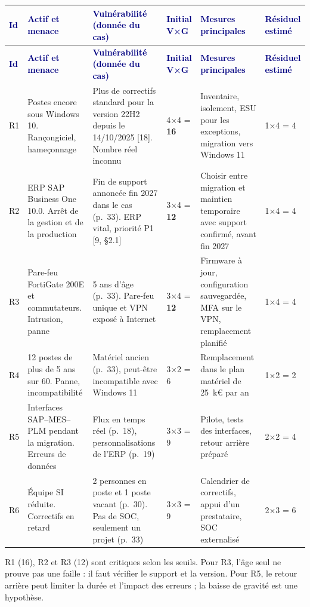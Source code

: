 \documentclass[11pt,a4paper]{article}
\newcommand{\thd}[1]{\textbf{\textcolor{navy}{#1}}}
\newcommand{\figsource}[1]{\par\vspace{-2pt}{\RaggedRight\footnotesize\textcolor{graytext}{#1}\par}}
\begin{document}
\begin{xltabular}{\linewidth}{@{}C{7mm}P{28mm}YC{15mm}YC{16mm}@{}}\toprule
\thd{Id} & \thd{Actif et menace} & \thd{Vulnérabilité (donnée du cas)} & \thd{Initial V×G} & \thd{Mesures principales} & \thd{Résiduel estimé}\\\midrule\endfirsthead
\toprule \thd{Id} & \thd{Actif et menace} & \thd{Vulnérabilité (donnée du cas)} & \thd{Initial V×G} & \thd{Mesures principales} & \thd{Résiduel estimé}\\\midrule\endhead
\bottomrule\endfoot
R1 & Postes encore sous Windows 10. Rançongiciel, hameçonnage & Plus de correctifs standard pour la version 22H2 depuis le 14/10/2025 [18]. Nombre réel inconnu & 4×4 = \textbf{16} & Inventaire, isolement, ESU pour les exceptions, migration vers Windows 11 & 1×4 = 4\\
R2 & ERP SAP Business One 10.0. Arrêt de la gestion et de la production & Fin de support annoncée fin 2027 dans le cas (p.~33). ERP vital, priorité P1 [9, §2.1] & 3×4 = \textbf{12} & Choisir entre migration et maintien temporaire avec support confirmé, avant fin 2027 & 1×4 = 4\\
R3 & Pare-feu FortiGate 200E et commutateurs. Intrusion, panne & 5 ans d'âge (p.~33). Pare-feu unique et VPN exposé à Internet & 3×4 = \textbf{12} & Firmware à jour, configuration sauvegardée, MFA sur le VPN, remplacement planifié & 1×4 = 4\\
R4 & 12 postes de plus de 5 ans sur 60. Panne, incompatibilité & Matériel ancien (p.~33), peut-être incompatible avec Windows 11 & 3×2 = 6 & Remplacement dans le plan matériel de 25~k€ par an & 1×2 = 2\\
R5 & Interfaces SAP--MES--PLM pendant la migration. Erreurs de données & Flux en temps réel (p.~18), personnalisations de l'ERP (p.~19) & 3×3 = 9 & Pilote, tests des interfaces, retour arrière préparé & 2×2 = 4\\
R6 & Équipe SI réduite. Correctifs en retard & 2 personnes en poste et 1 poste vacant (p.~30). Pas de SOC, seulement un projet (p.~33) & 3×3 = 9 & Calendrier de correctifs, appui d'un prestataire, SOC externalisé & 2×3 = 6\\
\end{xltabular}
\figsource{Notes : hypothèses du groupe. ESU : mises à jour de sécurité étendues, payantes. SOC : centre de surveillance de la sécurité.}

R1 (16), R2 et R3 (12) sont critiques selon les seuils. Pour R3, l'âge seul ne prouve pas une faille : il faut vérifier le support et la version. Pour R5, le retour arrière peut limiter la durée et l'impact des erreurs ; la baisse de gravité est une hypothèse.
\end{document}
